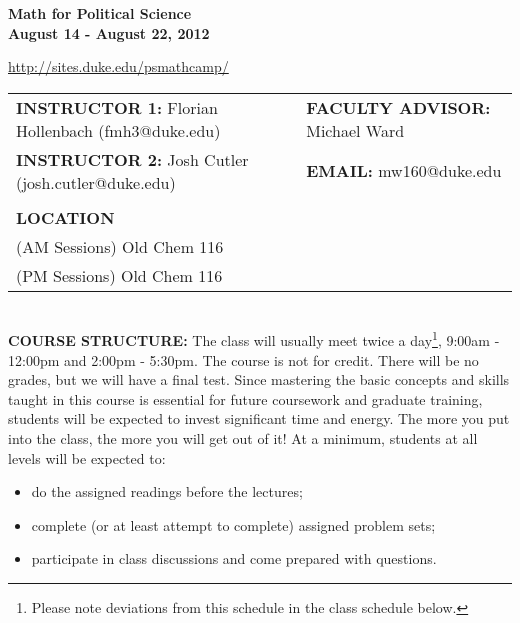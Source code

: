 \documentclass[12pt,a4paper]{article}
\begin{document}
 \begin{center}

     {\LARGE \textbf{Math for Political Science}}\\
     
     {\large \textbf{August 14 - August 22, 2012}}\\
      
     \mbox{}
     
     \url{http://sites.duke.edu/psmathcamp/}

     \mbox{}
     
     
\end{center}

\begin{small}

\begin{tabular}{l l}
\textbf{INSTRUCTOR 1:} Florian Hollenbach (fmh3@duke.edu)    &  \textbf{FACULTY ADVISOR:} Michael Ward     \\
\textbf{INSTRUCTOR 2:} Josh Cutler (josh.cutler@duke.edu)& \textbf{EMAIL:} mw160@duke.edu\\
      &     \\
 \textbf{LOCATION}			&   \\
 (AM Sessions) Old Chem 116 &\\
 (PM Sessions) Old Chem 116 & \\
 


\end{tabular}

\end{small}  
\mbox{}\\

\textbf{COURSE STRUCTURE:} The class will usually meet twice a day\footnote{Please note deviations from this schedule in the class schedule below.}, 9:00am - 12:00pm and 2:00pm - 5:30pm. The course is not for credit. There will be no grades, but we will have a final test. Since mastering the basic concepts and skills taught in this course is essential for future coursework and graduate training, students will be expected to invest significant time and energy. The more you put into the class, the more you will get out of it! At a minimum, students at all levels will be expected to:
\begin{itemize}
\item do the assigned readings before the lectures;
\item complete (or at least attempt to complete) assigned problem sets;
\item participate in class discussions and come prepared with questions.
\end{itemize}
\end{document}
